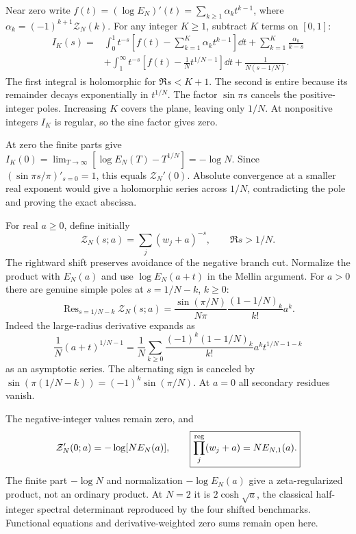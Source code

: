 Near zero write $f(t)=(\log E_N)'(t)=\sum_{k\ge1}\alpha_kt^{k-1}$,
where $\alpha_k=(-1)^{k+1}\mathcal Z_N(k)$.
For any integer $K\ge1$, subtract $K$ terms on $[0,1]$:
\[
\begin{aligned}
I_K(s)={}&\int_0^1t^{-s}\left[f(t)-\sum_{k=1}^K\alpha_kt^{k-1}\right]\dd t
+\sum_{k=1}^K\frac{\alpha_k}{k-s}\\
&+\int_1^\infty t^{-s}\left[f(t)-\frac1N t^{1/N-1}\right]\dd t
+\frac{1}{N(s-1/N)}.
\end{aligned}
\]
The first integral is holomorphic for $\Re s<K+1$. The second is entire because
its remainder decays exponentially in $t^{1/N}$. The factor $\sin\pi s$ cancels
the positive-integer poles. Increasing $K$ covers the plane, leaving only
$1/N$. At nonpositive integers $I_K$ is regular, so the sine factor gives zero.

At zero the finite parts give
\(I_K(0)=\lim_{T\to\infty}[\log E_N(T)-T^{1/N}]=-\log N.\)
Since $(\sin\pi s/\pi)'_{s=0}=1$, this equals $\mathcal Z_N'(0)$.
Absolute convergence at a smaller real exponent would give a holomorphic
series across $1/N$, contradicting the pole and proving the exact abscissa.

For real $a\ge0$, define initially
\[
\mathcal Z_N(s;a)=\sum_j(w_j+a)^{-s},\qquad\Re s>1/N.
\]
The rightward shift preserves avoidance of the negative branch cut.
Normalize the product with $E_N(a)$ and use
$\log E_N(a+t)$ in the Mellin argument.
For $a>0$ there are genuine simple poles at $s=1/N-k$, $k\ge0$:
\[
\boxed{\operatorname{Res}_{s=1/N-k}\mathcal Z_N(s;a)
=\frac{\sin(\pi/N)}{N\pi}\frac{(1-1/N)_k}{k!}a^k.}
\]
Indeed the large-radius derivative expands as
\[
\frac1N(a+t)^{1/N-1}
=\frac1N\sum_{k\ge0}\frac{(-1)^k(1-1/N)_k}{k!}a^kt^{1/N-1-k}
\]
as an asymptotic series. The alternating sign is canceled by
$\sin(\pi(1/N-k))=(-1)^k\sin(\pi/N)$.
At $a=0$ all secondary residues vanish.

The negative-integer values remain zero, and
\[
\mathcal Z_N'(0;a)=-\log[N E_N(a)],\qquad
\boxed{\prod_j^{\rm reg}(w_j+a)=N E_{N,1}(a).}
\]
The finite part $-\log N$ and normalization $-\log E_N(a)$ give a
zeta-regularized product, not an ordinary product. At $N=2$ it is
$2\cosh\sqrt a$, the classical half-integer spectral determinant reproduced
by the four shifted benchmarks. Functional equations and derivative-weighted
zero sums remain open here.
